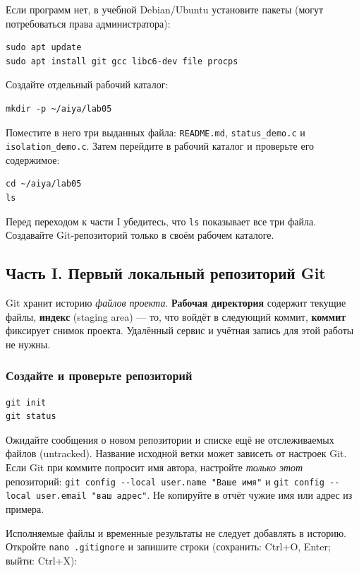 Если программ нет, в учебной Debian/Ubuntu установите пакеты (могут
потребоваться права администратора):

\begin{verbatim}
sudo apt update
sudo apt install git gcc libc6-dev file procps
\end{verbatim}

Создайте отдельный рабочий каталог:

\begin{verbatim}
mkdir -p ~/aiya/lab05
\end{verbatim}

Поместите в него три выданных файла: \texttt{README.md},
\texttt{status\_demo.c} и \texttt{isolation\_demo.c}. Затем перейдите
в рабочий каталог и проверьте его содержимое:

\begin{verbatim}
cd ~/aiya/lab05
ls
\end{verbatim}

Перед переходом к части I убедитесь, что \texttt{ls} показывает все три
файла. Создавайте Git-репозиторий только в своём рабочем каталоге.

\subsection{Часть I. Первый локальный репозиторий Git}

Git хранит историю \emph{файлов проекта}.
\textbf{Рабочая директория} содержит текущие файлы, \textbf{индекс} (staging
area) --- то, что войдёт в следующий коммит, \textbf{коммит} фиксирует
снимок проекта. Удалённый сервис и учётная запись для этой работы не нужны.

\subsubsection*{Создайте и проверьте репозиторий}

\begin{verbatim}
git init
git status
\end{verbatim}

Ожидайте сообщения о новом репозитории и списке ещё не отслеживаемых файлов
(untracked). Название исходной ветки может зависеть от настроек Git. Если
Git при коммите попросит имя автора, настройте \emph{только этот} репозиторий:
\texttt{git config -{}-local user.name "Ваше имя"} и
\texttt{git config -{}-local user.email "ваш адрес"}. Не копируйте в отчёт
чужие имя или адрес из примера.

Исполняемые файлы и временные результаты не следует добавлять в историю.
Откройте \texttt{nano .gitignore} и запишите строки (сохранить: Ctrl+O,
Enter; выйти: Ctrl+X):

